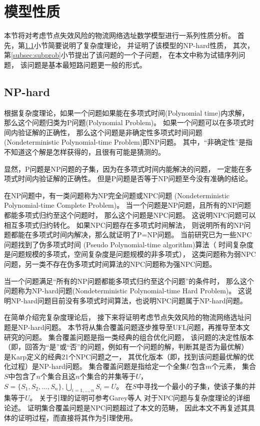 \section{模型性质}
\label{sec:attribute}
本节将对考虑节点失效风险的物流网络选址数学模型进行一系列性质分析。
首先，第\ref{subsec:nph}小节简要说明了复杂度理论，
并证明了该模型的NP-hard性质，
其次，第\ref{subsec:subprob}小节提出了该问题的一个子问题，
在本文中称为试错序列问题，
该问题是基本最短路问题更一般的形式。

\subsection{NP-hard}
\label{subsec:nph}
根据复杂度理论，如果一个问题如果能在多项式时间(Polynomial time)内求解，
那么这个问题归类为P问题(Polynomial Problem)。
如果一个问题可以在多项式时间内验证解的正确性，
那么这个问题是非确定性多项式时间问题
(Nondeterministic Polynomial-time Problem)即NP问题。
其中，``非确定性''是指不知道这个解是怎样获得的，且很有可能是猜测的。

显然，P问题是NP问题的子集，因为在多项式时间内能解决的问题，
一定能在多项式时间内验证解的正确性。
但是P问题是否等于NP问题至今没有准确的结论。

在NP问题中，有一类问题称为NP完全问题或NPC问题
(Nondeterministic Polynomial-time Complete Problem)。
当一个问题是NP问题，且所有的NP问题都能多项式归约至这个问题时，
那么这个问题是NPC问题。
这说明NPC问题可以相互多项式归约转化。
如果NPC问题存在多项式时间解法，
则说明所有的NP问题都能在多项式时间内解决，那么就证明了P=NP问题。
当前研究已为一些NPC问题找到了伪多项式时间
(Pseudo Polynomial-time algorithm)算法（
时间复杂度是问题规模的多项式，空间复杂度是问题规模的非多项式），
这类问题称为弱NPC问题，另一类不存在伪多项式时间算法的NPC问题称为强NPC问题。

当一个问题满足``所有的NP问题都能多项式归约至这个问题''的条件时，
那么这个问题称为NP-hard问题(Nondeterministic Polynomial-time Hard Problem)。
这说明NP-hard问题目前没有多项式时间算法，也说明NPC问题属于NP-hard问题。

在简单介绍完复杂度理论后，
接下来将证明考虑节点失效风险的物流网络选址问题是NP-hard问题。
本节将从集合覆盖问题逐步推导至UFL问题，再推导至本文研究的问题。
集合覆盖问题是指一类经典的组合优化问题，
该问题的决定性版本（即，回答为``是''或``否''的问题，例如有一个问题的解，判断其是否为最优解）
是Karp\cite{karp}定义的经典21个NPC问题之一，
其优化版本（即，找到该问题最优解的优化过程）是NP-hard问题。
集合覆盖问题是指给定一个全集$U$包含$m$个元素，
集合$S$中包含了$n$个集合且这$n$个集合的并集等于$U$，
$S=\{ S_1, S_2, ..., S_n\}, \bigcup_{i = 1,...,n}S_i = U$。
在$S$中寻找一个最小的子集，使该子集的并集等于$U$。
关于引理的证明可参考Garey等人\cite{garey1979computers}
对于NPC问题与复杂度理论的详细论述。
证明集合覆盖问题是NPC问题超过了本文的范畴，
因此本文不再复述其具体的证明过程，而直接将其作为引理使用。

